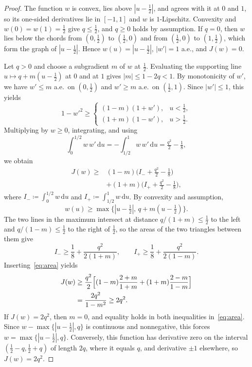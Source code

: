 \documentclass[twocolumn,a4paper]{article}
\numberwithin{equation}{section}
\theoremstyle{remark}
\newcommand{\1}{\mathbf{1}}
\newcommand{\de}{\,\mathrm{d}}
\begin{document}
\begin{proof}
The function \(w\) is convex, lies above \(|u-\tfrac12|\), and agrees with it at \(0\) and \(1\), so its one-sided derivatives lie in \([-1,1]\) and \(w\) is \(1\)-Lipschitz.
Convexity and \(w(0)=w(1)=\tfrac12\) give \(q\le\tfrac12\), and \(q\ge0\) holds by assumption.
If \(q=0\), then \(w\) lies below the chords from \((0,\tfrac12)\) to \((\tfrac12,0)\) and from \((\tfrac12,0)\) to \((1,\tfrac12)\), which form the graph of \(|u-\tfrac12|\).
Hence \(w(u)=|u-\tfrac12|\), \(|w'|=1\) a.e., and \(J(w)=0\).

Let \(q>0\) and choose a subgradient \(m\) of \(w\) at \(\tfrac12\).
Evaluating the supporting line \(u\mapsto q+m(u-\tfrac12)\) at \(0\) and at \(1\) gives \(|m|\le1-2q<1\).
By monotonicity of \(w'\), we have \(w'\le m\) a.e.\ on \((0,\tfrac12)\) and \(w'\ge m\) a.e.\ on \((\tfrac12,1)\).
Since \(|w'|\le1\), this yields
\[
1-w'^2\ge
\begin{cases}
(1-m)(1+w'),&u<\tfrac12,\\
(1+m)(1-w'),&u>\tfrac12.
\end{cases}
\]
Multiplying by \(w\ge0\), integrating, and using
\[
\int_0^{1/2}w\,w'\de u=-\int_{1/2}^1w\,w'\de u=\tfrac{q^2}2-\tfrac18,
\]
we obtain
\begin{align*}
J(w)\ge{}&(1-m)\bigl(I_-+\tfrac{q^2}2-\tfrac18\bigr)\\
&+(1+m)\bigl(I_++\tfrac{q^2}2-\tfrac18\bigr),
\end{align*}
where \(I_-\coloneqq\int_0^{1/2}w\de u\) and \(I_+\coloneqq\int_{1/2}^1w\de u\).
By convexity and assumption,
\[
w(u)\ge\max\bigl\{|u-\tfrac12|,\,q+m(u-\tfrac12)\bigr\}.
\]
The two lines in the maximum intersect at distance \(q/(1+m)\le\tfrac12\) to the left and \(q/(1-m)\le\tfrac12\) to the right of \(\tfrac12\), so the areas of the two triangles between them give
\begin{equation}\label{eq:area}
I_-\ge\frac18+\frac{q^2}{2(1+m)},\qquad I_+\ge\frac18+\frac{q^2}{2(1-m)}.
\end{equation}
Inserting~\eqref{eq:area} yields
\begin{align*}
J(w)&\ge\frac{q^2}2\Bigl[(1-m)\frac{2+m}{1+m}+(1+m)\frac{2-m}{1-m}\Bigr]\\
&=\frac{2q^2}{1-m^2}\ge2q^2.
\end{align*}
If \(J(w)=2q^2\), then \(m=0\), and equality holds in both inequalities in~\eqref{eq:area}.
Since \(w-\max\{|u-\tfrac12|,q\}\) is continuous and nonnegative, this forces \(w=\max\{|u-\tfrac12|,q\}\).
Conversely, this function has derivative zero on the interval \((\tfrac12-q,\tfrac12+q)\) of length \(2q\), where it equals \(q\), and derivative \(\pm1\) elsewhere, so \(J(w)=2q^2\).
\end{proof}
\end{document}
